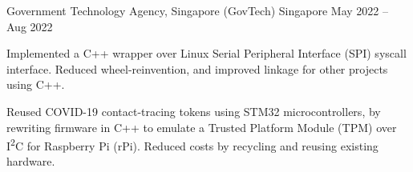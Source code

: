 \begin{cventries}

	{Government Technology Agency, Singapore (GovTech)} %
	{Singapore} %
	{May 2022 -- Aug 2022} %
	{
		\begin{cvitems} %
			\item Implemented a C++ wrapper over Linux Serial Peripheral Interface (SPI) syscall interface. Reduced wheel-reinvention, and improved linkage for other projects using C++.
			\item Reused COVID-19 contact-tracing tokens using STM32 microcontrollers, by rewriting firmware in C++ to emulate a Trusted Platform Module (TPM) over I\textsuperscript{2}C for Raspberry Pi (rPi). Reduced costs by recycling and reusing existing hardware.
		\end{cvitems}
	}


\end{cventries}

